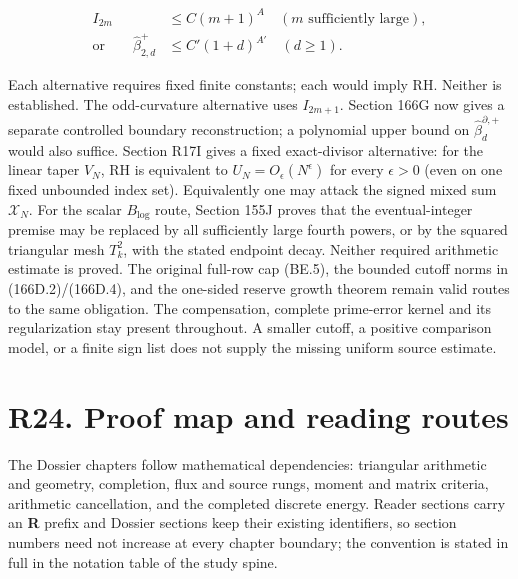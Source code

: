 \documentclass[
  11pt,
]{book}
\begin{document}
\[
\boxed{\begin{aligned}
I_{2m}&\le C(m+1)^A\quad(m\text{ sufficiently large}),\\
\text{or}\qquad \widehat\beta_{2,d}^+&\le C'(1+d)^{A'}\quad(d\ge1).
\end{aligned}}
\tag{23.4}
\]

Each alternative requires fixed finite constants; each would imply RH.
Neither is established. The odd-curvature alternative uses \(I_{2m+1}\).
Section 166G now gives a separate controlled boundary reconstruction; a
polynomial upper bound on \(\widehat\beta_d^{\partial,+}\) would also
suffice. Section R17I gives a fixed exact-divisor alternative: for the
linear taper \(V_N\), RH is equivalent to \(U_N=O_\epsilon(N^\epsilon)\)
for every \(\epsilon>0\) (even on one fixed unbounded index set).
Equivalently one may attack the signed mixed sum \(\mathcal X_N\). For
the scalar \(B_{\log}\) route, Section 155J proves that the
eventual-integer premise may be replaced by all sufficiently large
fourth powers, or by the squared triangular mesh \(T_k^2\), with the
stated endpoint decay. Neither required arithmetic estimate is proved.
The original full-row cap (BE.5), the bounded cutoff norms in
(166D.2)/(166D.4), and the one-sided reserve growth theorem remain valid
routes to the same obligation. The compensation, complete prime-error
kernel and its regularization stay present throughout. A smaller cutoff,
a positive comparison model, or a finite sign list does not supply the
missing uniform source estimate.

\section{R24. Proof map and reading
routes}\label{r24.-proof-map-and-reading-routes}

The Dossier chapters follow mathematical dependencies: triangular
arithmetic and geometry, completion, flux and source rungs, moment and
matrix criteria, arithmetic cancellation, and the completed discrete
energy. Reader sections carry an \textbf{R} prefix and Dossier sections
keep their existing identifiers, so section numbers need not increase at
every chapter boundary; the convention is stated in full in the notation
table of the study spine.
\end{document}
